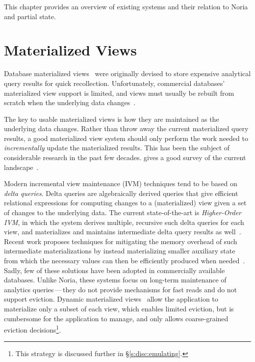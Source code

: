 This chapter provides an overview of existing systems and their relation to
Noria and partial state.

\section{Materialized Views}

Database materialized views~\cite{materialized-views} were originally devised to
store expensive analytical query results for quick recollection. Unfortunately,
commercial databases' materialized view support is limited, and views must
usually be rebuilt from scratch when the underlying data
changes~\cite{materialized-view-selection-sql-server,
mssql-materialized-view-restrictions-blog,
mssql-materialized-view-restrictions}.

The key to usable materialized views is how they are maintained as the
underlying data changes. Rather than throw away the current materialized query
results, a good materialized view system should only perform the work needed to
\textit{incrementally} update the materialized results. This has been the
subject of considerable research in the past few decades.
\citeauthor{materialized-survey} gives a good survey of the current
landscape~\cite{materialized-survey}.

Modern incremental view maintenance (IVM) techniques tend to be based on
\textit{delta queries}. Delta queries are algebraically derived queries that
give efficient relational expressions for computing changes to a (materialized)
view given a set of changes to the underlying data. The current state-of-the-art
is \textit{Higher-Order IVM}, in which the system derives multiple, recursive
such delta queries for each view, and materializes and maintains intermediate
delta query results as well~\cite{dbtoaster, hotdog}. Recent work proposes
techniques for mitigating the memory overhead of such intermediate
materializations by instead materializing smaller auxiliary state from which the
necessary values can then be efficiently produced when
needed~\cite{memory-efficient}. Sadly, few of these solutions have been adopted
in commercially available databases. Unlike Noria, these systems focus on
long-term maintenance of analytics queries\,---\,they do not provide mechanisms
for fast reads and do not support eviction. Dynamic materialized
views~\cite{dynamic-materialized-views, partially-materialized-views} allow the
application to materialize only a subset of each view, which enables limited
eviction, but is cumbersome for the application to manage, and only allows
coarse-grained eviction decisions\footnote{This strategy is discussed further in
\S\ref{s:disc:emulating}.}.

